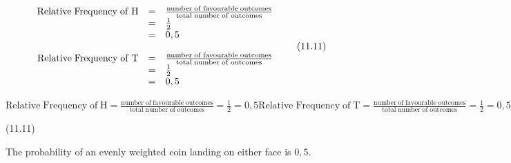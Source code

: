 {\begin{mdframed}[linewidth=4, leftmargin=40, rightmargin=40]
\begin{exercise}
\begin{enumerate}[noitemsep, label=\textbf{Step} \textbf{\arabic*}. ]
{    \begin{equation}
    \begin{array}{ccc}\hfill \mathrm{Relative\; Frequency\; of\; H}& =& \frac{\mathrm{number\; of\; favourable\; outcomes}}{\mathrm{total\; number\; of\; outcomes}}\hfill \\ & =& \frac{1}{2}\hfill \\ & =& 0,5\hfill \\ \\ \hfill \mathrm{Relative\; Frequency\; of\; T}& =& \frac{\mathrm{number\; of\; favourable\; outcomes}}{\mathrm{total\; number\; of\; outcomes}}\hfill \\ & =& \frac{1}{2}\hfill \\ & =& 0,5\hfill \end{array}\tag{11.11}
      \end{equation}
    }{%
    \setlength{\mymathboxwidth}{\columnwidth}
      \addtolength{\mymathboxwidth}{-48pt}
    \par\vspace{12pt}\noindent\begin{minipage}{\columnwidth}
    \parbox[t]{\mymathboxwidth}{\large\begin{math}
    \mathrm{Relative\; Frequency\; of\; H}=\frac{\mathrm{number\; of\; favourable\; outcomes}}{\mathrm{total\; number\; of\; outcomes}}=\frac{1}{2}=0,5\mathrm{Relative\; Frequency\; of\; T}=\frac{\mathrm{number\; of\; favourable\; outcomes}}{\mathrm{total\; number\; of\; outcomes}}=\frac{1}{2}=0,5\end{math}}\hfill
    \parbox[t]{48pt}{\raggedleft 
    (11.11)}
    \end{minipage}\vspace{12pt}\par
    }%
    
      
      \label{m39373*id113899}The probability of an evenly weighted coin landing on
either face is \begin{math}0,5\end{math}. \par 
      \end{enumerate}
         

    \end{exercise}
    \end{mdframed}
    }
    \noindent
  
